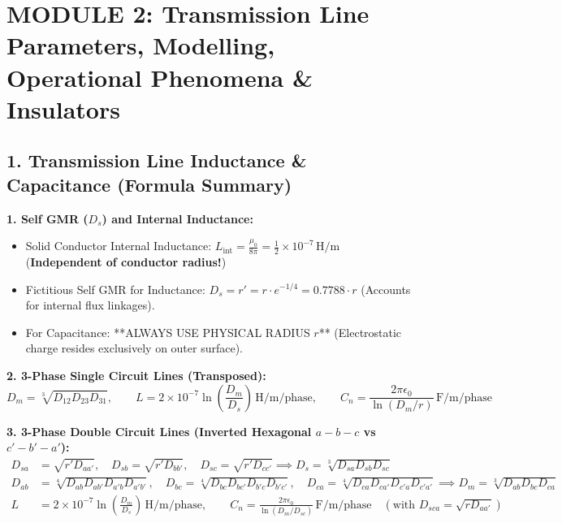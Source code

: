 \documentclass[10pt,a4paper]{article}
\begin{document}
\clearpage
\section{MODULE 2: Transmission Line Parameters, Modelling, Operational Phenomena \& Insulators}

\subsection{1. Transmission Line Inductance \& Capacitance (Formula Summary)}

\begin{tcolorbox}[formulabox, title=Inductance and Capacitance Exact Working Formulas]
\small
\textbf{1. Self GMR ($D_s$) and Internal Inductance:}
\begin{itemize}
  \item Solid Conductor Internal Inductance: $L_{\text{int}} = \frac{\mu_0}{8\pi} = \frac{1}{2} \times 10^{-7}\,\text{H/m}$ \quad (\textbf{Independent of conductor radius!})
  \item Fictitious Self GMR for Inductance: $D_s = r' = r \cdot e^{-1/4} = 0.7788 \cdot r$ \quad (Accounts for internal flux linkages).
  \item For Capacitance: **ALWAYS USE PHYSICAL RADIUS $r$** (Electrostatic charge resides exclusively on outer surface).
\end{itemize}

\textbf{2. 3-Phase Single Circuit Lines (Transposed):}
\begin{equation*}
  D_m = \sqrt[3]{D_{12} D_{23} D_{31}}, \qquad L = 2 \times 10^{-7} \ln\left(\frac{D_m}{D_s}\right)\,\text{H/m/phase}, \qquad C_n = \frac{2\pi\epsilon_0}{\ln(D_m / r)}\,\text{F/m/phase}
\end{equation*}

\textbf{3. 3-Phase Double Circuit Lines (Inverted Hexagonal $a-b-c$ vs $c'-b'-a'$):}
\begin{align*}
  D_{sa} &= \sqrt{r' D_{aa'}}, \quad D_{sb} = \sqrt{r' D_{bb'}}, \quad D_{sc} = \sqrt{r' D_{cc'}} \implies D_s = \sqrt[3]{D_{sa} D_{sb} D_{sc}} \\
  D_{ab} &= \sqrt[4]{D_{ab} D_{ab'} D_{a'b} D_{a'b'}}, \quad D_{bc} = \sqrt[4]{D_{bc} D_{bc'} D_{b'c} D_{b'c'}}, \quad D_{ca} = \sqrt[4]{D_{ca} D_{ca'} D_{c'a} D_{c'a'}} \implies D_m = \sqrt[3]{D_{ab} D_{bc} D_{ca}} \\
  L &= 2 \times 10^{-7} \ln\left(\frac{D_m}{D_s}\right)\,\text{H/m/phase}, \qquad C_n = \frac{2\pi\epsilon_0}{\ln(D_m / D_{sc})}\,\text{F/m/phase} \quad (\text{with } D_{sca} = \sqrt{r D_{aa'}})
\end{align*}
\end{tcolorbox}
\end{document}
